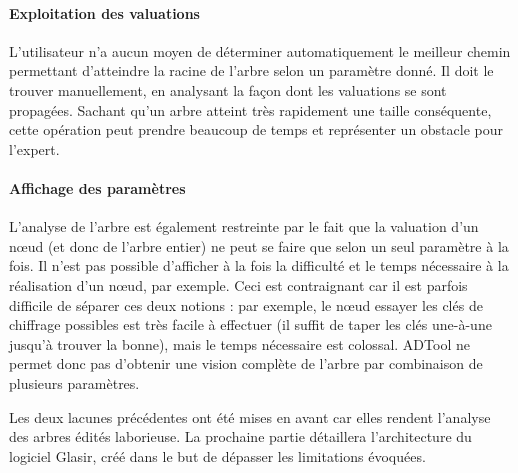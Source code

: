 	\paragraph{Exploitation des valuations} L'utilisateur n'a aucun moyen de déterminer automatiquement le \og meilleur chemin \fg{} permettant d'atteindre la racine de l'arbre selon un paramètre donné. Il doit le trouver manuellement, en analysant la façon dont les valuations se sont propagées. Sachant qu'un arbre atteint très rapidement une taille conséquente, cette opération peut prendre beaucoup de temps et représenter un obstacle pour l'expert.

	\paragraph{Affichage des paramètres} L'analyse de l'arbre est également restreinte par le fait que la valuation d'un nœud (et donc de l'arbre entier) ne peut se faire que selon un seul paramètre à la fois. Il n'est pas possible d'afficher à la fois la \og difficulté \fg{} et le \og temps nécessaire \fg{} à la réalisation d'un nœud, par exemple. Ceci est contraignant car il est parfois difficile de séparer ces deux notions : par exemple, le nœud \og essayer les clés de chiffrage possibles \fg{} est très facile à effectuer (il suffit de taper les clés une-à-une jusqu'à trouver la bonne), mais le temps nécessaire est colossal. ADTool ne permet donc pas d'obtenir une vision complète de l'arbre par combinaison de plusieurs paramètres.

	Les deux lacunes précédentes ont été mises en avant car elles rendent l'analyse des arbres édités laborieuse. La prochaine partie détaillera l'architecture du logiciel Glasir, créé dans le but de dépasser les limitations évoquées.
